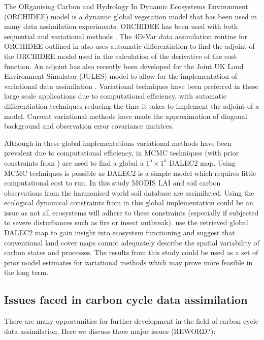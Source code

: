 \documentclass[12pt]{article}
\begin{document}
The ORganising Carbon and Hydrology In Dynamic Ecosystems Environment (ORCHIDEE) model \citep{Krinner2005} is a dynamic global vegetation model that has been used in many data assimilation experiments. ORCHIDEE has been used with both sequential \citep{Demarty2007} and variational methods \citep{Bacour2015}. The 4D-Var data assimilation routine for ORCHIDEE outlined in \citet{Kuppel2012} also uses automatic differentiation to find the adjoint of the ORCHIDEE model used in the calculation of the derivative of the cost function. An adjoint has also recently been developed for the Joint UK Land Environment Simulator (JULES) model to allow for the implementation of variational data assimilation \citep{raoult2016land}. Variational techniques have been preferred in these large scale applications due to computational efficiency, with automatic differentiation techniques reducing the time it takes to implement the adjoint of a model. Current variational methods have made the approximation of diagonal background and observation error covariance matrices. %

Although in these global implementations variational methods have been prevalent due to computational efficiency, in \citet{bloom2016decadal} MCMC techniques (with prior constraints from \citet{Bloom2015}) are used to find a global a \(1^\text{o} \times 1^\text{o}\) DALEC2 map. Using MCMC techniques is possible as DALEC2 is a simple model which requires little computational cost to run. In this study MODIS LAI and soil carbon observations from the harmonised world soil database are assimilated. Using the ecological dynamical constraints from \citet{Bloom2015} in this global implementation could be an issue as not all ecosystems will adhere to these constraints (especially if subjected to severe disturbances such as fire or insect outbreak). \citet{bloom2016decadal} use the retrieved global DALEC2 map to gain insight into ecosystem functioning and suggest that conventional land cover maps cannot adequately describe the spatial variability of carbon states and processes. The results from this study could be used as a set of prior model estimates for variational methods which may prove more feasible in the long term. 

\subsection{Issues faced in carbon cycle data assimilation}

There are many opportunities for further development in the field of carbon cycle data assimilation. Here we discuss three major issues (REWORD?):
\end{document}
